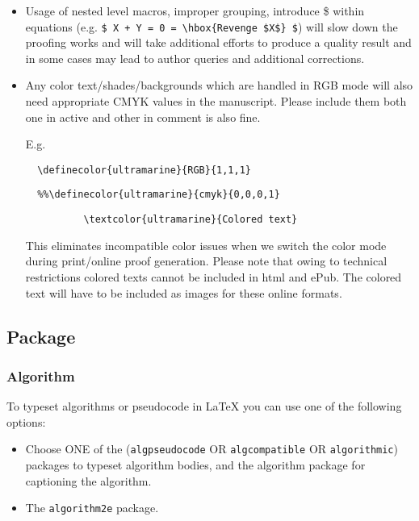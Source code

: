 \documentclass[graybox]{svmono}
\begin{document}
\begin{itemize}
\item Usage of nested level macros, improper grouping, introduce \$ within equations (e.g. \verb|$ X + Y = 0 = \hbox{Revenge $X$} $|) will slow down the proofing works and will take additional efforts to produce a quality result and in some cases may lead to author queries and additional corrections.

\item Any color text/shades/backgrounds which are handled in RGB mode will also need appropriate CMYK values in the manuscript. Please include them both one in active and other in comment is also fine. 
    
\noindent
E.g. 
\begin{center}
\verb|	\definecolor{ultramarine}{RGB}{1,1,1}|

\verb|	%%\definecolor{ultramarine}{cmyk}{0,0,0,1}|
		
\verb|	        \textcolor{ultramarine}{Colored text}|
\end{center}
    
\eject

\noindent
This eliminates incompatible color issues when we switch the color mode during print/online proof generation. Please note that owing to technical restrictions colored texts cannot be included in html and ePub. The colored text will have to be included as images for these online formats.

\end{itemize}

\vspace*{-12pt}
\subsection*{Package}

\subsubsection*{Algorithm}

To typeset algorithms or pseudocode in LaTeX you can use one of the following options: 

\begin{itemize}
\item Choose ONE of the (\texttt{algpseudocode} OR \texttt{algcompatible} OR \texttt{algorithmic}) packages to typeset algorithm bodies, and the algorithm package for captioning the algorithm.

\item The \texttt{algorithm2e} package.
\end{itemize}
\end{document}
